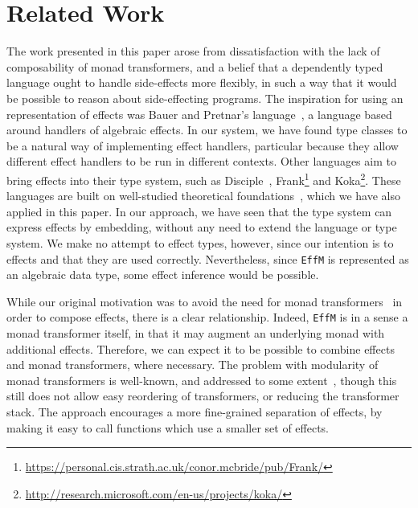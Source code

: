 \section{Related Work}

\label{sect:related}

The work presented in this paper arose from dissatisfaction with the 
lack of composability of monad transformers, and a belief that a dependently
typed language ought to handle side-effects more flexibly, in such a way
that it would be possible to reason about side-effecting programs. The
inspiration for using an  representation of effects was
Bauer and Pretnar's  language~\cite{Bauer}, a language
based around handlers of algebraic effects. In our \Eff{} system, we have
found type classes to be a natural way of implementing effect handlers,
particular because they allow different effect handlers to be run in
different contexts. Other languages aim to bring effects into their
type system, such as Disciple~\cite{Lippmeier2009}, 
Frank\footnote{\url{https://personal.cis.strath.ac.uk/conor.mcbride/pub/Frank/}}
and
Koka\footnote{\url{http://research.microsoft.com/en-us/projects/koka/}}.
These languages are built on well-studied theoretical
foundations~\cite{Hyland2006,Levy2001,Plotkin2009,Pretnar2010}, 
which we have also applied in this paper.
%
In our approach, we have seen that the \Idris{} type system can express
effects by embedding, without any need to extend the language or type system. 
We make no attempt to  effect types, however, since our intention
is to  effects and  that they are used correctly.
Nevertheless, since \texttt{EffM} is represented as an algebraic data type,
some effect inference would be possible.


While our original motivation was to avoid the need for monad
transformers~\cite{Liang1995} in order to compose effects, there is a clear
relationship. Indeed, \texttt{EffM}
is in a sense a monad transformer itself, in that it may augment an underlying
monad with additional effects. Therefore, we can expect it to be possible
to combine effects and monad transformers, where necessary. 
The problem with modularity of monad transformers is well-known, and addressed
to some extent~\cite{Jaskelioff2009}, though this still does not allow easy
reordering of transformers, or reducing the transformer stack.
The \Eff{} approach encourages a more fine-grained separation of effects,
by making it easy to call functions which use a smaller set of effects.

